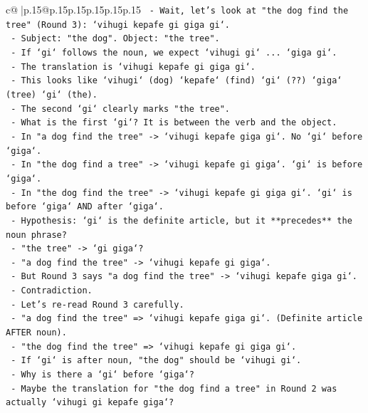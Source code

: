 \documentclass{article}
\begin{document}
{\begin{supertabular}{c@{$\;$}|p{.15\linewidth}@{}p{.15\linewidth}p{.15\linewidth}p{.15\linewidth}p{.15\linewidth}p{.15\linewidth}}
{{{\texttt{        {-} Wait, let's look at "the dog find the tree" (Round 3): `vihugi kepafe gi giga gi`.} \\
\texttt{          {-} Subject: "the dog". Object: "the tree".} \\
\texttt{          {-} If `gi` follows the noun, we expect `vihugi gi` ... `giga gi`.} \\
\texttt{          {-} The translation is `vihugi kepafe gi giga gi`.} \\
\texttt{          {-} This looks like `vihugi` (dog) `kepafe` (find) `gi` (??) `giga` (tree) `gi` (the).} \\
\texttt{          {-} The second `gi` clearly marks "the tree".} \\
\texttt{          {-} What is the first `gi`? It is between the verb and the object.} \\
\texttt{          {-} In "a dog find the tree" {-}> `vihugi kepafe giga gi`. No `gi` before `giga`.} \\
\texttt{          {-} In "the dog find a tree" {-}> `vihugi kepafe gi giga`. `gi` is before `giga`.} \\
\texttt{          {-} In "the dog find the tree" {-}> `vihugi kepafe gi giga gi`. `gi` is before `giga` AND after `giga`.} \\
\texttt{          {-} Hypothesis: `gi` is the definite article, but it **precedes** the noun phrase?} \\
\texttt{            {-} "the tree" {-}> `gi giga`?} \\
\texttt{            {-} "a dog find the tree" {-}> `vihugi kepafe gi giga`.} \\
\texttt{            {-} But Round 3 says "a dog find the tree" {-}> `vihugi kepafe giga gi`.} \\
\texttt{            {-} Contradiction.} \\
\texttt{          {-} Let's re{-}read Round 3 carefully.} \\
\texttt{            {-} "a dog find the tree" => `vihugi kepafe giga gi`. (Definite article AFTER noun).} \\
\texttt{            {-} "the dog find the tree" => `vihugi kepafe gi giga gi`.} \\
\texttt{              {-} If `gi` is after noun, "the dog" should be `vihugi gi`.} \\
\texttt{              {-} Why is there a `gi` before `giga`?} \\
\texttt{              {-} Maybe the translation for "the dog find a tree" in Round 2 was actually `vihugi gi kepafe giga`?} \\
}}}
\end{supertabular}}
\end{document}
